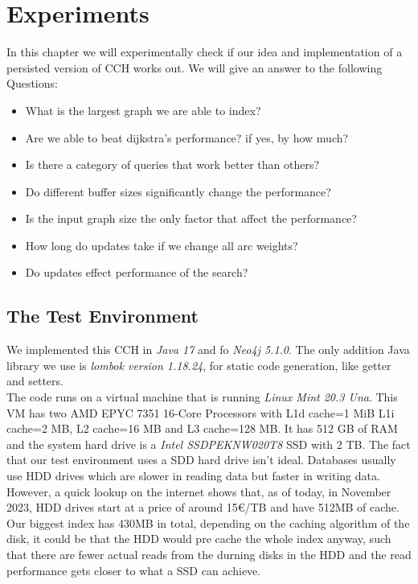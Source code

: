 \chapter{Experiments}

In this chapter we will experimentally check if our idea and implementation of a persisted version of CCH works out. We will give an answer to the following Questions:
\begin{itemize}
    \item What is the largest graph we are able to index?
    \item Are we able to beat dijkstra's performance? if yes, by how much?
    \item Is there a category of queries that work better than others?
    \item Do different buffer sizes significantly change the performance?
    \item Is the input graph size the only factor that affect the performance?
    \item How long do updates take if we change all arc weights?
    \item Do updates effect performance of the search?
\end{itemize}

\section{The Test Environment}

We implemented this CCH in \textit{Java 17} and fo \textit{Neo4j 5.1.0}. The only addition Java library we use is \textit{lombok version 1.18.24}, for static code generation, like getter and setters.
\\
The code runs on a virtual machine that is running \textit{Linux Mint 20.3 Una}. This VM has two  AMD EPYC 7351 16-Core Processors with L1d cache=1 MiB L1i cache=2 MB, L2 cache=16 MB and L3 cache=128 MB. 
It has 512 GB of RAM and the system hard drive is a \textit{Intel SSDPEKNW020T8} SSD with 2 TB.
The fact that our test environment uses a SDD hard drive isn't ideal. Databases usually use HDD drives which are slower in reading data but faster in writing data. However, a quick lookup on the internet shows that,
as of today, in November 2023, HDD drives start at a price of around 15€/TB and have 512MB of cache. Our biggest index has 430MB in total, depending on the caching algorithm of the disk, it could be that 
the HDD would pre cache the whole index anyway, such that there are fewer actual reads from the durning disks in the HDD and the read performance gets closer to what a SSD can achieve.

